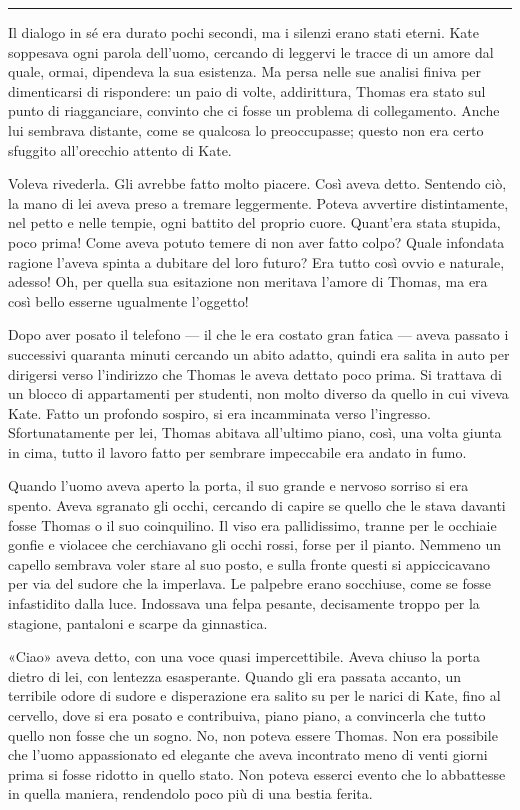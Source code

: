\documentclass[a4paper,oneside,9pt]{memoir}
\begin{document}
\plainbreak{1}

Il dialogo in sé era durato pochi secondi, ma i silenzi erano stati eterni. Kate soppesava ogni parola dell'uomo,
cercando di leggervi le tracce di un amore dal quale, ormai, dipendeva la sua esistenza. Ma persa nelle sue analisi
finiva per dimenticarsi di rispondere: un paio di volte, addirittura, Thomas era stato sul punto di riagganciare,
convinto che ci fosse un problema di collegamento. Anche lui sembrava distante, come se qualcosa lo preoccupasse; questo
non era certo sfuggito all'orecchio attento di Kate.

Voleva rivederla. Gli avrebbe fatto molto piacere. Così aveva detto. Sentendo ciò, la mano di lei aveva preso a tremare
leggermente. Poteva avvertire distintamente, nel petto e nelle tempie, ogni battito del proprio cuore. Quant'era stata
stupida, poco prima! Come aveva potuto temere di non aver fatto colpo? Quale infondata ragione l'aveva spinta a dubitare
del loro futuro? Era tutto così ovvio e naturale, adesso! Oh, per quella sua esitazione non meritava l'amore di Thomas,
ma era così bello esserne ugualmente l'oggetto!

Dopo aver posato il telefono --- il che le era costato gran fatica --- aveva passato i successivi quaranta minuti
cercando un abito adatto, quindi era salita in auto per dirigersi verso l'indirizzo che Thomas le aveva dettato poco
prima. Si trattava di un blocco di appartamenti per studenti, non molto diverso da quello in cui viveva Kate. Fatto un
profondo sospiro, si era incamminata verso l'ingresso. Sfortunatamente per lei, Thomas abitava all'ultimo piano, così,
una volta giunta in cima, tutto il lavoro fatto per sembrare impeccabile era andato in fumo.

Quando l'uomo aveva aperto la porta, il suo grande e nervoso sorriso si era spento. Aveva sgranato gli occhi, cercando
di capire se quello che le stava davanti fosse Thomas o il suo coinquilino. Il viso era pallidissimo, tranne per le
occhiaie gonfie e violacee che cerchiavano gli occhi rossi, forse per il pianto. Nemmeno un capello sembrava voler stare
al suo posto, e sulla fronte questi si appiccicavano per via del sudore che la imperlava. Le palpebre erano socchiuse,
come se fosse infastidito dalla luce. Indossava una felpa pesante, decisamente troppo per la stagione, pantaloni e
scarpe da ginnastica.

«Ciao» aveva detto, con una voce quasi impercettibile. Aveva chiuso la porta dietro di lei, con lentezza esasperante.
Quando gli era passata accanto, un terribile odore di sudore e disperazione era salito su per le narici di Kate, fino al
cervello, dove si era posato e contribuiva, piano piano, a convincerla che tutto quello non fosse che un sogno. No, non
poteva essere Thomas. Non era possibile che l'uomo appassionato ed elegante che aveva incontrato meno di venti giorni
prima si fosse ridotto in quello stato. Non poteva esserci evento che lo abbattesse in quella maniera, rendendolo poco
più di una bestia ferita.
\end{document}
